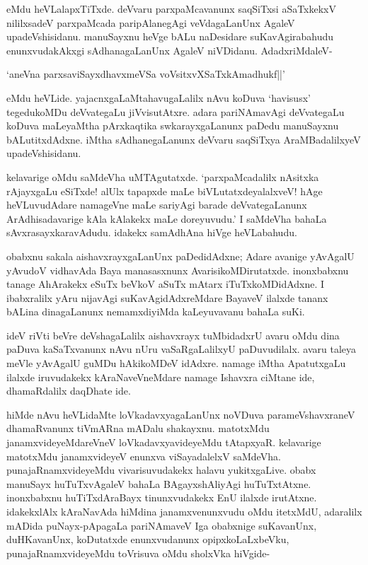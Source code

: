 \noindent eMdu heVLalapxTiTxde. deVvaru parxpaMcavanunx saqSiTxsi aSaTxkekxV nililxsadeV parxpaMcada paripAlanegAgi veVdagaLanUnx AgaleV upadeVshisidanu. manuSayxnu heVge bALu naDesidare suKavAgirabahudu enunxvudakAkxgi sAdhanagaLanUnx AgaleV niVDidanu. AdadxriMdaleV-

\begin{shloka}
`aneVna parxsaviSayxdhavxmeVSa voV\s sitxvXSaTxkAmadhukf||'
\end{shloka}

\noindent eMdu heVLide. yajacnxgaLaMtahavugaLalilx nAvu koDuva `havisusx' tegedukoMDu deVvategaLu jiVvisutAtxre. adara pariNAmavAgi deVvategaLu koDuva maLeyaMtha pArxkaqtika swkarayxgaLanunx paDedu manuSayxnu bALutitxdAdxne. iMtha sAdhanegaLanunx deVvaru saqSiTxya AraMBadalilxyeV upadeVshisidanu.

kelavarige oMdu saMdeVha uMTAgutatxde. `parxpaMcadalilx nAsitxka rAjayxgaLu eSiTxde! alUlx tapapxde maLe biVLutatxdeyalalxveV! hAge heVLuvudAdare namageVne maLe sariyAgi barade deVvategaLanunx ArAdhisadavarige kAla kAlakekx maLe doreyuvudu.' I saMdeVha bahaLa sAvxrasayxkaravAdudu. idakekx samAdhAna hiVge heVLabahudu.

obabxnu sakala aishavxrayxgaLanUnx paDedidAdxne; Adare avanige yAvAgalU yAvudoV vidhavAda Baya manasasxnunx AvarisikoMDirutatxde. inonxbabxnu tanage AhArakekx eSuTx beVkoV aSuTx mAtarx iTuTxkoMDidAdxne. I ibabxralilx yAru nijavAgi suKavAgidAdxreMdare BayaveV ilalxde tananx bALina dinagaLanunx nemamxdiyiMda kaLeyuvavanu bahaLa suKi.

ideV riVti beVre deVshagaLalilx aishavxrayx tuMbidadxrU avaru oMdu dina paDuva kaSaTxvanunx nAvu nUru vaSaRgaLalilxyU paDuvudilalx. avaru taleya meVle yAvAgalU guMDu hAkikoMDeV idAdxre. namage iMtha ApatutxgaLu ilalxde iruvudakekx kAraNaveVneMdare namage Ishavxra ciMtane ide, dhamaRdalilx daqDhate ide.

hiMde nAvu heVLidaMte loVkadavxyagaLanUnx noVDuva parameVshavxraneV dhamaRvanunx tiVmARna mADalu shakayxnu. matotxMdu janamxvideyeMdareVneV loVkadavxyavideyeMdu tAtapxyaR. kelavarige matotxMdu janamxvideyeV enunxva viSayadalelxV saMdeVha. punajaRnamxvideyeMdu vivarisuvudakekx halavu yukitxgaLive. obabx manuSayx huTuTxvAgaleV bahaLa BAgayxshAliyAgi huTuTxtAtxne. inonxbabxnu huTiTxdAraBayx tinunxvudakekx EnU ilalxde irutAtxne. idakekxlAlx kAraNavAda hiMdina janamxvenunxvudu oMdu itetxMdU, adaralilx mADida puNayx-pApagaLa pariNAmaveV Iga obabxnige suKavanUnx, duHKavanUnx, koDutatxde enunxvudanunx opipxkoLaLxbeVku, punajaRnamxvideyeMdu toVrisuva oMdu sholxVka hiVgide-

